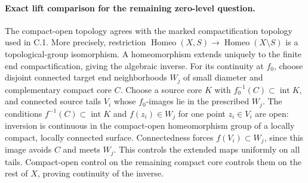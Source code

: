 \paragraph{Exact lift comparison for the remaining zero-level question.}
The compact-open topology agrees with the marked compactification
topology used in C.1. More precisely, restriction
$\operatorname{Homeo}(X,S)\to\operatorname{Homeo}(X\setminus S)$
is a topological-group isomorphism. A homeomorphism extends uniquely
to the finite end compactification, giving the algebraic inverse.
For its continuity at $f_0$, choose disjoint connected target end
neighborhoods $W_j$ of small diameter and complementary compact
core $C$. Choose a source core $K$ with
$f_0^{-1}(C)\subset\operatorname{int}K$, and connected source tails
$V_i$ whose $f_0$-images lie in the prescribed $W_j$.
The conditions $f^{-1}(C)\subset\operatorname{int}K$ and
$f(z_i)\in W_j$ for one point $z_i\in V_i$ are open:
inversion is continuous in the compact-open homeomorphism group
of a locally compact, locally connected surface.
Connectedness forces $f(V_i)\subset W_j$, since this image avoids
$C$ and meets $W_j$. This controls the extended maps uniformly on
all tails. Compact-open control on the remaining compact core
controls them on the rest of $X$, proving continuity of the inverse.

